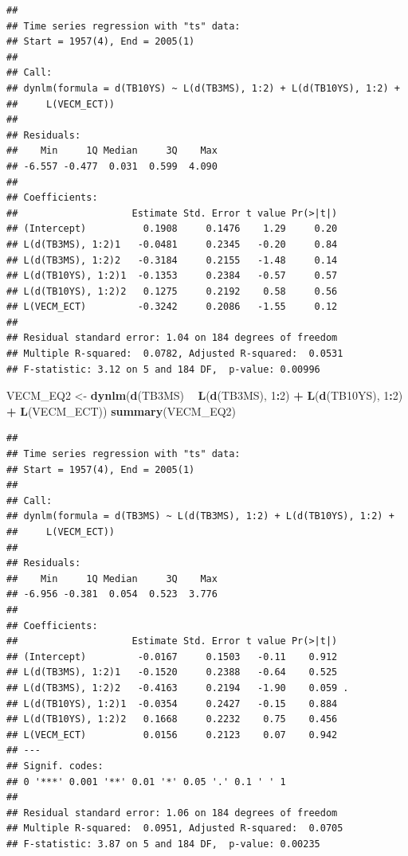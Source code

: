 \documentclass[]{book}
\newenvironment{Shaded}{\begin{snugshade}}{\end{snugshade}}
\newcommand{\DecValTok}[1]{\textcolor[rgb]{0.00,0.00,0.81}{#1}}
\newcommand{\KeywordTok}[1]{\textcolor[rgb]{0.13,0.29,0.53}{\textbf{#1}}}
\newcommand{\NormalTok}[1]{#1}
\newcommand{\OperatorTok}[1]{\textcolor[rgb]{0.81,0.36,0.00}{\textbf{#1}}}
\newcommand{\StringTok}[1]{\textcolor[rgb]{0.31,0.60,0.02}{#1}}
\begin{document}
\begin{verbatim}
## 
## Time series regression with "ts" data:
## Start = 1957(4), End = 2005(1)
## 
## Call:
## dynlm(formula = d(TB10YS) ~ L(d(TB3MS), 1:2) + L(d(TB10YS), 1:2) + 
##     L(VECM_ECT))
## 
## Residuals:
##    Min     1Q Median     3Q    Max 
## -6.557 -0.477  0.031  0.599  4.090 
## 
## Coefficients:
##                    Estimate Std. Error t value Pr(>|t|)
## (Intercept)          0.1908     0.1476    1.29     0.20
## L(d(TB3MS), 1:2)1   -0.0481     0.2345   -0.20     0.84
## L(d(TB3MS), 1:2)2   -0.3184     0.2155   -1.48     0.14
## L(d(TB10YS), 1:2)1  -0.1353     0.2384   -0.57     0.57
## L(d(TB10YS), 1:2)2   0.1275     0.2192    0.58     0.56
## L(VECM_ECT)         -0.3242     0.2086   -1.55     0.12
## 
## Residual standard error: 1.04 on 184 degrees of freedom
## Multiple R-squared:  0.0782, Adjusted R-squared:  0.0531 
## F-statistic: 3.12 on 5 and 184 DF,  p-value: 0.00996
\end{verbatim}

\begin{Shaded}
\begin{Highlighting}[]
\NormalTok{VECM_EQ2 <-}\StringTok{ }\KeywordTok{dynlm}\NormalTok{(}\KeywordTok{d}\NormalTok{(TB3MS) }\OperatorTok{~}\StringTok{ }\KeywordTok{L}\NormalTok{(}\KeywordTok{d}\NormalTok{(TB3MS), }\DecValTok{1}\OperatorTok{:}\DecValTok{2}\NormalTok{) }\OperatorTok{+}\StringTok{ }\KeywordTok{L}\NormalTok{(}\KeywordTok{d}\NormalTok{(TB10YS), }\DecValTok{1}\OperatorTok{:}\DecValTok{2}\NormalTok{) }\OperatorTok{+}\StringTok{ }\KeywordTok{L}\NormalTok{(VECM_ECT))}
\KeywordTok{summary}\NormalTok{(VECM_EQ2)}
\end{Highlighting}
\end{Shaded}

\begin{verbatim}
## 
## Time series regression with "ts" data:
## Start = 1957(4), End = 2005(1)
## 
## Call:
## dynlm(formula = d(TB3MS) ~ L(d(TB3MS), 1:2) + L(d(TB10YS), 1:2) + 
##     L(VECM_ECT))
## 
## Residuals:
##    Min     1Q Median     3Q    Max 
## -6.956 -0.381  0.054  0.523  3.776 
## 
## Coefficients:
##                    Estimate Std. Error t value Pr(>|t|)  
## (Intercept)         -0.0167     0.1503   -0.11    0.912  
## L(d(TB3MS), 1:2)1   -0.1520     0.2388   -0.64    0.525  
## L(d(TB3MS), 1:2)2   -0.4163     0.2194   -1.90    0.059 .
## L(d(TB10YS), 1:2)1  -0.0354     0.2427   -0.15    0.884  
## L(d(TB10YS), 1:2)2   0.1668     0.2232    0.75    0.456  
## L(VECM_ECT)          0.0156     0.2123    0.07    0.942  
## ---
## Signif. codes:  
## 0 '***' 0.001 '**' 0.01 '*' 0.05 '.' 0.1 ' ' 1
## 
## Residual standard error: 1.06 on 184 degrees of freedom
## Multiple R-squared:  0.0951, Adjusted R-squared:  0.0705 
## F-statistic: 3.87 on 5 and 184 DF,  p-value: 0.00235
\end{verbatim}
\end{document}

